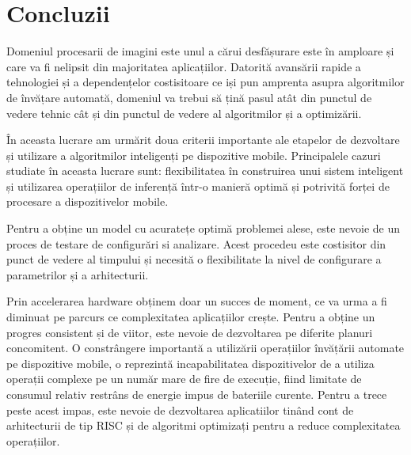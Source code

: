 \chapter{Concluzii}

Domeniul procesarii de imagini este unul a cărui desfășurare este în amploare și care va fi nelipsit din majoritatea aplicațiilor. Datorită avansării rapide a tehnologiei și a dependențelor costisitoare ce iși pun amprenta asupra algoritmilor de învățare automată, domeniul va trebui să țină pasul atât din punctul de vedere tehnic cât și din punctul de vedere al algoritmilor și a optimizării. \newline

În aceasta lucrare am urmărit doua criterii importante ale etapelor de dezvoltare și utilizare a algoritmilor inteligenți pe dispozitive mobile. Principalele cazuri studiate în aceasta lucrare sunt: flexibilitatea în construirea unui sistem inteligent și utilizarea operațiilor de inferență într-o manieră optimă și potrivită forței de procesare a dispozitivelor mobile.\newline

Pentru a obține un model cu acuratețe optimă problemei alese, este nevoie de un proces de testare de configurări si analizare. Acest procedeu este costisitor din punct de vedere al timpului și necesită o flexibilitate la nivel de configurare a parametrilor și a arhitecturii.\newline

Prin accelerarea hardware obținem doar un succes de moment, ce va urma a fi diminuat pe parcurs ce complexitatea aplicațiilor crește. Pentru a obține un progres consistent și de viitor, este nevoie de dezvoltarea pe diferite planuri concomitent. O constrângere importantă a utilizării operațiilor învățării automate pe dispozitive mobile, o reprezintă incapabilitatea dispozitivelor de a utiliza operații complexe pe un număr mare de fire de execuție, fiind limitate de consumul relativ restrâns de energie impus de bateriile curente. Pentru a trece peste acest impas, este nevoie de dezvoltarea aplicatiilor tinând cont de arhitecturii de tip RISC și de algoritmi optimizați pentru a reduce complexitatea operațiilor.

